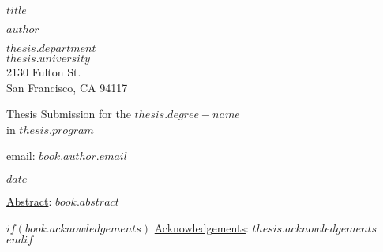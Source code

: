 \pagestyle{empty}

\begin{titlepage}
\singlespacing
\begin{center}
\Huge
{\bf {$title$}}

\vspace*{2.0cm}


{\Large {$author$}}

\vspace*{0.5cm}

\normalsize
$thesis.department$\\
$thesis.university$\\
2130 Fulton St.\\
San Francisco, CA 94117\\

\vspace*{0.5cm}

\normalsize
Thesis Submission for the $thesis.degree-name$\\
in $thesis.program$\\

\vspace*{0.5cm}

\normalsize
email: \textit{$book.author.email$}\\

\vspace*{0.5cm}

{\normalsize $date$}

\vspace*{2.0cm}

\begin{flushleft}

\normalsize \underline{Abstract}: $book.abstract$

$if(book.acknowledgements)$
  \vspace*{0.5cm}
  {\normalsize \underline{Acknowledgements}: $thesis.acknowledgements$}
$endif$

\end{flushleft}


\end{center}
\end{titlepage}

